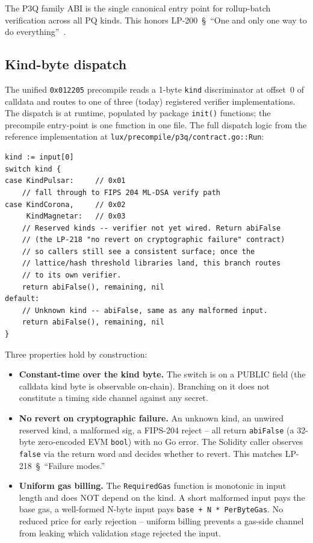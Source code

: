 The P3Q family ABI is the single canonical entry point for
rollup-batch verification across all PQ kinds. This honors
LP-200~\S~``One and only one way to do everything''~\cite{lp200}.

\subsection{Kind-byte dispatch}

The unified \texttt{0x012205} precompile reads a 1-byte
\texttt{kind} discriminator at offset~0 of calldata and routes
to one of three (today) registered verifier implementations. The
dispatch is at runtime, populated by package
\texttt{init()} functions; the precompile entry-point is one
function in one file. The full dispatch logic from the reference
implementation at
\texttt{lux/precompile/p3q/contract.go::Run}:

\begin{lstlisting}[language={}]
kind := input[0]
switch kind {
case KindPulsar:     // 0x01
    // fall through to FIPS 204 ML-DSA verify path
case KindCorona,     // 0x02
     KindMagnetar:   // 0x03
    // Reserved kinds -- verifier not yet wired. Return abiFalse
    // (the LP-218 "no revert on cryptographic failure" contract)
    // so callers still see a consistent surface; once the
    // lattice/hash threshold libraries land, this branch routes
    // to its own verifier.
    return abiFalse(), remaining, nil
default:
    // Unknown kind -- abiFalse, same as any malformed input.
    return abiFalse(), remaining, nil
}
\end{lstlisting}

Three properties hold by construction:

\begin{itemize}[leftmargin=2em,nosep]
\item \textbf{Constant-time over the kind byte.} The switch is on
  a PUBLIC field (the calldata kind byte is observable on-chain).
  Branching on it does not constitute a timing side channel
  against any secret.
\item \textbf{No revert on cryptographic failure.} An unknown
  kind, an unwired reserved kind, a malformed sig, a FIPS-204
  reject -- all return \texttt{abiFalse} (a 32-byte
  zero-encoded EVM \texttt{bool}) with no Go error. The Solidity
  caller observes \texttt{false} via the return word and
  decides whether to revert. This matches LP-218~\S~``Failure
  modes.''
\item \textbf{Uniform gas billing.} The \texttt{RequiredGas}
  function is monotonic in input length and does NOT depend on
  the kind. A short malformed input pays the base gas, a
  well-formed N-byte input pays \texttt{base + N * PerByteGas}.
  No reduced price for early rejection -- uniform billing
  prevents a gas-side channel from leaking which validation
  stage rejected the input.
\end{itemize}

